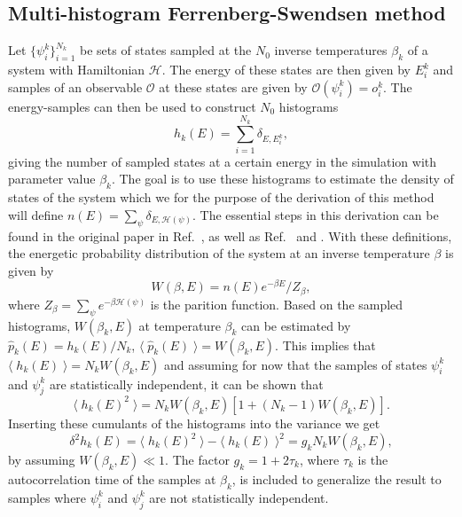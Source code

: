 \subsection{Multi-histogram Ferrenberg-Swendsen method}

Let $\{\psi_i^k\}_{i=1}^{N_k}$ be sets of states sampled at the $N_0$ inverse temperatures $\beta_k$ of a system with Hamiltonian $\mathcal{H}$.
The energy of these states are then given by $E_i^k$ and samples of an observable $\mathcal{O}$ at these states are given by $\mathcal{O}(\psi_i^k) = o_i^k$.
The energy-samples can then be used to construct $N_0$ histograms
\begin{equation}
    \label{eq:Monte:Reweighting:MFS:interactedLnSum}
    h_k(E) = \sum_{i=1}^{N_k}\delta_{E,E_i^k},
\end{equation}
giving the number of sampled states at a certain energy in the simulation with parameter value $\beta_k$. The goal is to use these histograms to estimate the
density of states of the system which we for the purpose of the derivation of this method will define $n(E) = \sum_\psi\delta_{E,\mathcal{H}(\psi)}$.
The essential steps in this derivation can be found in the original paper in Ref.~\cite{FS_1989}, as well as Ref.~\cite{Newman99} and \cite{rummukainen}.
With these
definitions, the energetic probability distribution of the system at an inverse temperature $\beta$ is given by
\begin{equation}
    \label{eq:Monte:Reweighting:MFS:enProbDist}
    W(\beta,E) = n(E)e^{-\beta E}/Z_\beta,
\end{equation}
where $Z_\beta = \sum_\psi e^{-\beta\mathcal{H}(\psi)}$ is the parition function. Based on the sampled histograms, $W(\beta_k,E)$ at temperature $\beta_k$ can be estimated
by $\hat{p}_k(E) = h_k(E)/N_k$, \ie $\langle\;\hat{p}_k(E)\;\rangle = W(\beta_k,E)$. This implies that $\langle\;h_k(E)\;\rangle = N_kW(\beta_k,E)$ and assuming for now
that the samples of states $\psi_i^k$ and $\psi_j^k$ are statistically independent, it can be shown that 
\begin{equation}
    \label{eq:Monte:Reweighting:MFS:avgHistogramSquared}
    \langle\;h_k(E)^2\;\rangle = N_kW(\beta_k,E)[1 + (N_k-1)W(\beta_k,E)].
\end{equation}
Inserting these cumulants of the histograms into the variance we get
\begin{equation}
    \label{eq:Monte:Reweighting:MFS:histogramVariance}
    \delta^2h_k(E) = \langle\;h_k(E)^2\;\rangle - \langle\;h_k(E)\;\rangle^2 = g_kN_kW(\beta_k,E),
\end{equation}
by assuming $W(\beta_k,E)\ll1$. The factor $g_k = 1+2\tau_k$, where $\tau_k$ is the autocorrelation time of the samples at $\beta_k$, is included to generalize the result
to samples where $\psi_i^k$ and $\psi_j^k$ are not statistically independent.

